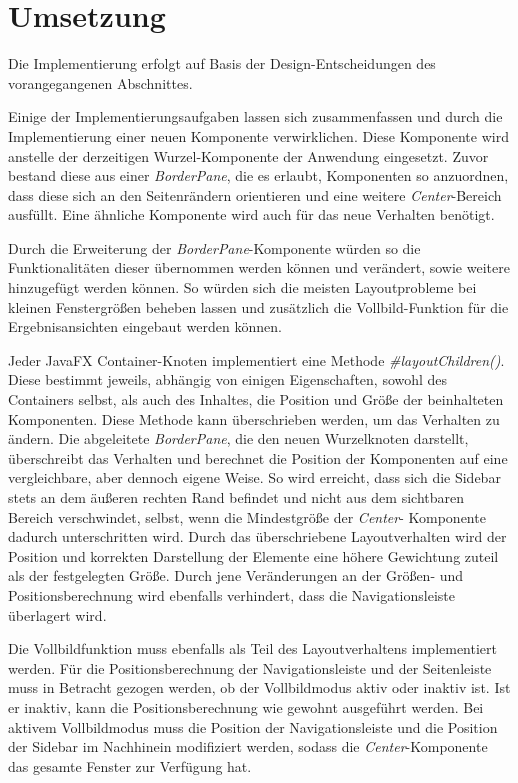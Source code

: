 \section{Umsetzung} \label{sec:responsiveImplementation}
Die Implementierung erfolgt auf Basis der Design-Entscheidungen des vorangegangenen Abschnittes.\par
{}
Einige der Implementierungsaufgaben lassen sich zusammenfassen und durch die Implementierung einer neuen Komponente verwirklichen. Diese Komponente wird anstelle der derzeitigen Wurzel-Komponente der Anwendung eingesetzt. Zuvor bestand diese aus einer \textit{BorderPane}, die es erlaubt, Komponenten so anzuordnen, dass diese sich an den Seitenrändern orientieren und eine weitere \textit{Center}-Bereich ausfüllt. Eine ähnliche Komponente wird auch für das neue Verhalten benötigt.\par
Durch die Erweiterung der \textit{BorderPane}-Komponente würden so die Funktionalitäten dieser übernommen werden können und verändert, sowie weitere hinzugefügt werden können. So würden sich die meisten Layoutprobleme bei kleinen Fenstergrößen beheben lassen und zusätzlich die Vollbild-Funktion für die Ergebnisansichten eingebaut werden können.\par
Jeder JavaFX Container-Knoten implementiert eine Methode \textit{\#{}layoutChildren()}. Diese bestimmt jeweils, abhängig von einigen Eigenschaften, sowohl des Containers selbst, als auch des Inhaltes, die Position und Größe der beinhalteten Komponenten. Diese Methode kann überschrieben werden, um das Verhalten zu ändern. Die abgeleitete \textit{BorderPane}, die den neuen Wurzelknoten darstellt, überschreibt das Verhalten und berechnet die Position der Komponenten auf eine vergleichbare, aber dennoch eigene Weise. So wird erreicht, dass sich die Sidebar stets an dem äußeren rechten Rand befindet und nicht aus dem sichtbaren Bereich verschwindet, selbst, wenn die Mindestgröße der \textit{Center}- Komponente dadurch unterschritten wird. Durch das überschriebene Layoutverhalten wird der Position und korrekten Darstellung der Elemente eine höhere Gewichtung zuteil als der festgelegten Größe. Durch jene Veränderungen an der Größen- und Positionsberechnung wird ebenfalls verhindert, dass die Navigationsleiste überlagert wird.\par
Die Vollbildfunktion muss ebenfalls als Teil des Layoutverhaltens implementiert werden. Für die Positionsberechnung der Navigationsleiste und der Seitenleiste muss in Betracht gezogen werden, ob der Vollbildmodus aktiv oder inaktiv ist. Ist er inaktiv, kann die Positionsberechnung wie gewohnt ausgeführt werden. Bei aktivem Vollbildmodus muss die Position der Navigationsleiste und die Position der Sidebar im Nachhinein modifiziert werden, sodass die \textit{Center}-Komponente das gesamte Fenster zur Verfügung hat.\par
